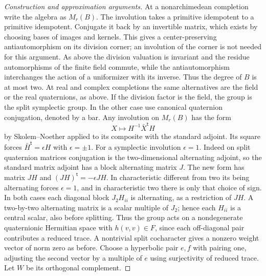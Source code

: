 \documentclass[11pt,a4paper,openany,oneside]{book}
\theoremstyle{resultstyle}
\theoremstyle{definition}
\numberwithin{equation}{chapter}
\begin{document}
\begin{proof}[Construction and approximation arguments]
At a nonarchimedean completion write the algebra as \(M_r(B)\).
The involution takes a primitive idempotent to a primitive
idempotent. Conjugate it back by an invertible matrix, which
exists by choosing bases of images and kernels. This gives
a center-preserving antiautomorphism on its division corner;
an involution of the corner is not needed for this argument.
As above the division valuation is invariant and the residue
automorphisms of the finite field commute, while the
antiautomorphism interchanges the action of a uniformizer with
its inverse. Thus the degree of \(B\) is at most two.
At real and complex completions the same alternatives
are the field or the real quaternions, as above.
If the division factor is the field, the group is the split
symplectic group. In the other case use canonical quaternion
conjugation, denoted by a bar. Any involution on \(M_r(B)\)
has the form
\[
 X\longmapsto H^{-1}\bar X^{\mathsf t}H
\]
by Skolem--Noether applied to its composite with the
standard adjoint. Its square forces
\(\bar H^{\mathsf t}=\epsilon H\) with \(\epsilon=\pm1\).
For a symplectic involution \(\epsilon=1\).
Indeed on split quaternion matrices conjugation is the
two-dimensional alternating adjoint, so the standard
matrix adjoint has a block alternating matrix \(J\).
The new form has matrix \(JH\) and
\((JH)^{\mathsf t}=-\epsilon JH\).
In characteristic different from two its being alternating
forces \(\epsilon=1\), and in characteristic two there is
only that choice of sign. In both cases each diagonal block
\(J_2 H_{ii}\) is alternating, as a restriction of \(JH\).
A two-by-two alternating matrix is a scalar multiple of
\(J_2\); hence each \(H_{ii}\) is a central scalar, also
before splitting. Thus the group acts on a nondegenerate
quaternionic Hermitian space with \(h(v,v)\in F\),
since each off-diagonal pair contributes a reduced trace.
A nontrivial split cocharacter gives a nonzero weight vector
of norm zero as before. Choose a hyperbolic pair \(e,f\)
with pairing one, adjusting the second vector by a multiple
of \(e\) using surjectivity of reduced trace. Let \(W\) be
its orthogonal complement.


\end{proof}
\end{document}
